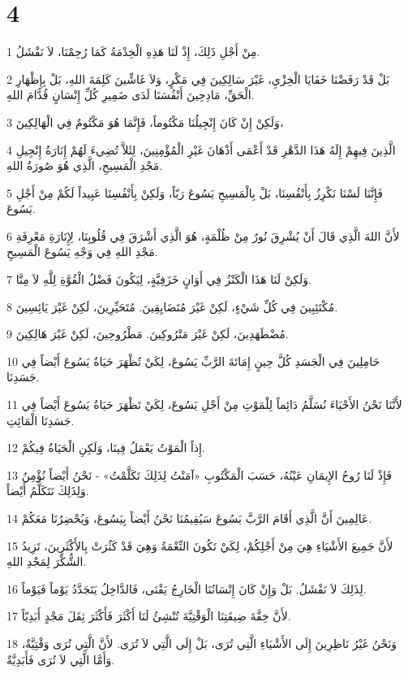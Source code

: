 \chapter{4}

\par 1 مِنْ أَجْلِ ذَلِكَ، إِذْ لَنَا هَذِهِ الْخِدْمَةُ كَمَا رُحِمْنَا، لاَ نَفْشَلُ.
\par 2 بَلْ قَدْ رَفَضْنَا خَفَايَا الْخِزْيِ، غَيْرَ سَالِكِينَ فِي مَكْرٍ، وَلاَ غَاشِّينَ كَلِمَةَ اللهِ، بَلْ بِإِظْهَارِ الْحَقِّ، مَادِحِينَ أَنْفُسَنَا لَدَى ضَمِيرِ كُلِّ إِنْسَانٍ قُدَّامَ اللهِ.
\par 3 وَلَكِنْ إِنْ كَانَ إِنْجِيلُنَا مَكْتُوماً، فَإِنَّمَا هُوَ مَكْتُومٌ فِي الْهَالِكِينَ،
\par 4 الَّذِينَ فِيهِمْ إِلَهُ هَذَا الدَّهْرِ قَدْ أَعْمَى أَذْهَانَ غَيْرِ الْمُؤْمِنِينَ، لِئَلاَّ تُضِيءَ لَهُمْ إِنَارَةُ إِنْجِيلِ مَجْدِ الْمَسِيحِ، الَّذِي هُوَ صُورَةُ اللهِ.
\par 5 فَإِنَّنَا لَسْنَا نَكْرِزُ بِأَنْفُسِنَا، بَلْ بِالْمَسِيحِ يَسُوعَ رَبّاً، وَلَكِنْ بِأَنْفُسِنَا عَبِيداً لَكُمْ مِنْ أَجْلِ يَسُوعَ.
\par 6 لأَنَّ اللهَ الَّذِي قَالَ أَنْ يُشْرِقَ نُورٌ مِنْ ظُلْمَةٍ، هُوَ الَّذِي أَشْرَقَ فِي قُلُوبِنَا، لِإِنَارَةِ مَعْرِفَةِ مَجْدِ اللهِ فِي وَجْهِ يَسُوعَ الْمَسِيحِ.
\par 7 وَلَكِنْ لَنَا هَذَا الْكَنْزُ فِي أَوَانٍ خَزَفِيَّةٍ، لِيَكُونَ فَضْلُ الْقُوَّةِ لِلَّهِ لاَ مِنَّا.
\par 8 مُكْتَئِبِينَ فِي كُلِّ شَيْءٍ، لَكِنْ غَيْرَ مُتَضَايِقِينَ. مُتَحَيِّرِينَ، لَكِنْ غَيْرَ يَائِسِينَ.
\par 9 مُضْطَهَدِينَ، لَكِنْ غَيْرَ مَتْرُوكِينَ. مَطْرُوحِينَ، لَكِنْ غَيْرَ هَالِكِينَ.
\par 10 حَامِلِينَ فِي الْجَسَدِ كُلَّ حِينٍ إِمَاتَةَ الرَّبِّ يَسُوعَ، لِكَيْ تُظْهَرَ حَيَاةُ يَسُوعَ أَيْضاً فِي جَسَدِنَا.
\par 11 لأَنَّنَا نَحْنُ الأَحْيَاءَ نُسَلَّمُ دَائِماً لِلْمَوْتِ مِنْ أَجْلِ يَسُوعَ، لِكَيْ تَظْهَرَ حَيَاةُ يَسُوعَ أَيْضاً فِي جَسَدِنَا الْمَائِتِ.
\par 12 إِذاً الْمَوْتُ يَعْمَلُ فِينَا، وَلَكِنِ الْحَيَاةُ فِيكُمْ.
\par 13 فَإِذْ لَنَا رُوحُ الإِيمَانِ عَيْنُهُ، حَسَبَ الْمَكْتُوبِ «آمَنْتُ لِذَلِكَ تَكَلَّمْتُ» - نَحْنُ أَيْضاً نُؤْمِنُ وَلِذَلِكَ نَتَكَلَّمُ أَيْضاً.
\par 14 عَالِمِينَ أَنَّ الَّذِي أَقَامَ الرَّبَّ يَسُوعَ سَيُقِيمُنَا نَحْنُ أَيْضاً بِيَسُوعَ، وَيُحْضِرُنَا مَعَكُمْ.
\par 15 لأَنَّ جَمِيعَ الأَشْيَاءِ هِيَ مِنْ أَجْلِكُمْ، لِكَيْ تَكُونَ النِّعْمَةُ وَهِيَ قَدْ كَثُرَتْ بِالأَكْثَرِينَ، تَزِيدُ الشُّكْرَ لِمَجْدِ اللهِ.
\par 16 لِذَلِكَ لاَ نَفْشَلُ. بَلْ وَإِنْ كَانَ إِنْسَانُنَا الْخَارِجُ يَفْنَى، فَالدَّاخِلُ يَتَجَدَّدُ يَوْماً فَيَوْماً.
\par 17 لأَنَّ خِفَّةَ ضِيقَتِنَا الْوَقْتِيَّةَ تُنْشِئُ لَنَا أَكْثَرَ فَأَكْثَرَ ثِقَلَ مَجْدٍ أَبَدِيّاً.
\par 18 وَنَحْنُ غَيْرُ نَاظِرِينَ إِلَى الأَشْيَاءِ الَّتِي تُرَى، بَلْ إِلَى الَّتِي لاَ تُرَى. لأَنَّ الَّتِي تُرَى وَقْتِيَّةٌ، وَأَمَّا الَّتِي لاَ تُرَى فَأَبَدِيَّةٌ.

